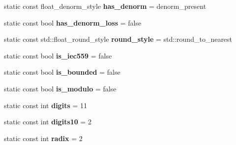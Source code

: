 \begin{DoxyCompactItemize}
static const float\+\_\+denorm\+\_\+style {\bfseries has\+\_\+denorm} = denorm\+\_\+present
\item 
\mbox{\label{structstd_1_1numeric__limits_3_01_eigen_1_1half_01_4_ac060eea2e3149a6e695d375a8e278fbd}} 
static const bool {\bfseries has\+\_\+denorm\+\_\+loss} = false
\item 
\mbox{\label{structstd_1_1numeric__limits_3_01_eigen_1_1half_01_4_a6f9846a93acb90702549a4706138259d}} 
static const std\+::float\+\_\+round\+\_\+style {\bfseries round\+\_\+style} = std\+::round\+\_\+to\+\_\+nearest
\item 
\mbox{\label{structstd_1_1numeric__limits_3_01_eigen_1_1half_01_4_afededa0adddc14211b5a9319bc269fa6}} 
static const bool {\bfseries is\+\_\+iec559} = false
\item 
\mbox{\label{structstd_1_1numeric__limits_3_01_eigen_1_1half_01_4_a9b110c86279a39f34221805e711b792d}} 
static const bool {\bfseries is\+\_\+bounded} = false
\item 
\mbox{\label{structstd_1_1numeric__limits_3_01_eigen_1_1half_01_4_a6206ba6f00318e90795d57035306e37b}} 
static const bool {\bfseries is\+\_\+modulo} = false
\item 
\mbox{\label{structstd_1_1numeric__limits_3_01_eigen_1_1half_01_4_a6f24b35ce1dceb49310235da7978f78c}} 
static const int {\bfseries digits} = 11
\item 
\mbox{\label{structstd_1_1numeric__limits_3_01_eigen_1_1half_01_4_a33e9f38cb026ac838d4782f67de06f10}} 
static const int {\bfseries digits10} = 2
\item 
\mbox{\label{structstd_1_1numeric__limits_3_01_eigen_1_1half_01_4_a6f51aec4619aea29f3f48d16d0b342df}} 
static const int {\bfseries radix} = 2
\item 
\mbox{\label{structstd_1_1numeric__limits_3_01_eigen_1_1half_01_4_a0b9f24453972e4f3e9d157a126999498}} 

\end{DoxyCompactItemize}
